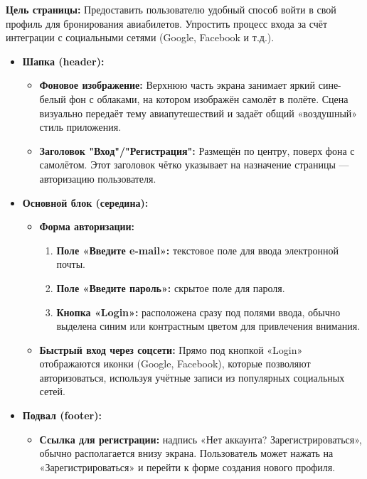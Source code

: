 \begin{enumerate}
        \textbf{Цель страницы:} Предоставить пользователю удобный способ войти в свой профиль для бронирования авиабилетов. Упростить процесс входа за счёт интеграции с социальными сетями (Google, Facebook и т.д.).
        \begin {itemize}
            \item \textbf{Шапка (header):}
            \begin{itemize}
                \item \textbf{Фоновое изображение:} Верхнюю часть экрана занимает яркий сине-белый фон с облаками, на котором изображён самолёт в полёте. Сцена визуально передаёт тему авиапутешествий и задаёт общий «воздушный» стиль приложения.
                \item \textbf{Заголовок "Вход"/"Регистрация":} Размещён по центру, поверх фона с самолётом. Этот заголовок чётко указывает на назначение страницы — авторизацию пользователя.
            \end{itemize}
            \item \textbf{Основной блок (середина):}
            \begin{itemize}
                \item \textbf{Форма авторизации:}
                \begin{enumerate}
                    \item \textbf{Поле «Введите e-mail»:} текстовое поле для ввода электронной почты.
                    \item \textbf{Поле «Введите пароль»:} скрытое поле для пароля.
                    \item \textbf{Кнопка «Login»:} расположена сразу под полями ввода, обычно выделена синим или контрастным цветом для привлечения внимания.
                \end{enumerate}
                \item \textbf{Быстрый вход через соцсети:} Прямо под кнопкой «Login» отображаются иконки (Google, Facebook), которые позволяют авторизоваться, используя учётные записи из популярных социальных сетей.
            \end{itemize}
            \item \textbf{Подвал (footer):}
            \begin{itemize}
                \item \textbf{Ссылка для регистрации:} надпись «Нет аккаунта? Зарегистрироваться», обычно располагается внизу экрана. Пользователь может нажать на «Зарегистрироваться» и перейти к форме создания нового профиля.
            \end{itemize}
        \end{itemize}


\end{enumerate}
